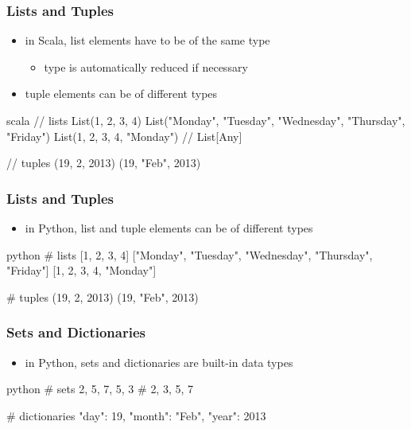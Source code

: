 \documentclass[dvipsnames]{beamer}
\theoremstyle{plain}
\begin{document}
\begin{frame}[fragile]
  \frametitle{Lists and Tuples}

  \begin{itemize}
    \item in Scala, list elements have to be of the same type
    \begin{itemize}
      \item type is automatically reduced if necessary
    \end{itemize}
    \item tuple elements can be of different types
  \end{itemize}

  \begin{example}[Scala]
    \begin{pygments}{scala}
// lists
List(1, 2, 3, 4)
List("Monday", "Tuesday", "Wednesday", "Thursday", "Friday")
List(1, 2, 3, 4, "Monday")  // List[Any]

// tuples
(19, 2, 2013)
(19, "Feb", 2013)
    \end{pygments}
  \end{example}
\end{frame}

\begin{frame}[fragile]
  \frametitle{Lists and Tuples}

  \begin{itemize}
    \item in Python, list and tuple elements can be of different types
  \end{itemize}

  \begin{example}[Python]
    \begin{pygments}{python}
# lists
[1, 2, 3, 4]
["Monday", "Tuesday", "Wednesday", "Thursday", "Friday"]
[1, 2, 3, 4, "Monday"]

# tuples
(19, 2, 2013)
(19, "Feb", 2013)
    \end{pygments}
  \end{example}
\end{frame}

\begin{frame}[fragile]
  \frametitle{Sets and Dictionaries}

  \begin{itemize}
    \item in Python, sets and dictionaries are built-in data types
  \end{itemize}

  \begin{example}[Python]
    \begin{pygments}{python}
# sets
{2, 5, 7, 5, 3}         # {2, 3, 5, 7}

# dictionaries
{"day": 19, "month": "Feb", "year": 2013}
    \end{pygments}
  \end{example}
\end{frame}
\end{document}
